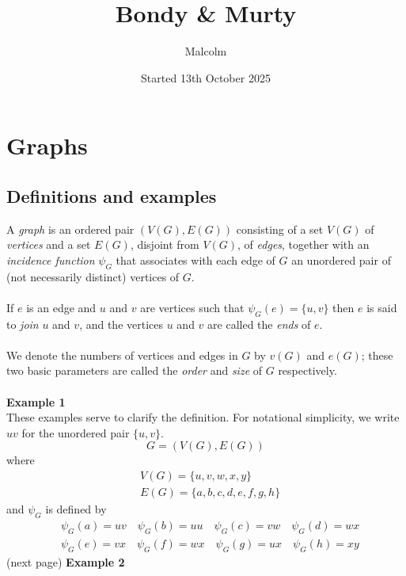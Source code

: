 \documentclass{report}
\title{Bondy \& Murty}
\date{Started 13th October 2025}
\author{Malcolm}
\theoremstyle{definition}
\begin{document}
\maketitle

\tableofcontents

\newpage
\chapter{Graphs}
\section{Definitions and examples}
A \textit{graph} is an ordered pair $(V(G),E(G))$ consisting of a set $V(G)$ of \textit{vertices} and a set $E(G)$, disjoint from $V(G)$, of \textit{edges}, together with an 
\textit{incidence function} $\psi_G$ that associates with each edge of $G$ an unordered pair of (not necessarily distinct) vertices of $G$.\\
\vspace{1mm}\\
If $e$ is an edge and $u$ and $v$ are vertices such that $\psi_G(e)=\{u,v\}$ then $e$ is said to \textit{join} $u$ and $v$, and the vertices $u$ and $v$ are called the \textit{ends} of $e$.\\
\vspace{1mm}\\
We denote the numbers of vertices and edges in $G$ by $v(G)$ and $e(G)$; these two basic parameters are called the \textit{order} and \textit{size} of $G$ respectively.\\
\vspace{1mm}\\
\textbf{Example 1}\\
These examples serve to clarify the definition. For notational simplicity, we write $uv$ for the unordered pair $\{u,v\}$.
\begin{equation*}
G=(V(G),E(G))
\end{equation*}
where
\begin{align*}
&V(G)=\{u,v,w,x,y\}\\
&E(G)=\{a,b,c,d,e,f,g,h\}
\end{align*}
and $\psi_G$ is defined by
\begin{align*}
&\psi_G(a)=uv\quad\psi_G(b)=uu\quad\psi_G(c)=vw\quad\psi_G(d)=wx\\
&\psi_G(e)=vx\quad\psi_G(f)=wx\quad\psi_G(g)=ux\quad\psi_G(h)=xy
\end{align*}
(next page)\newpage
\noindent\textbf{Example 2}
\end{document}
